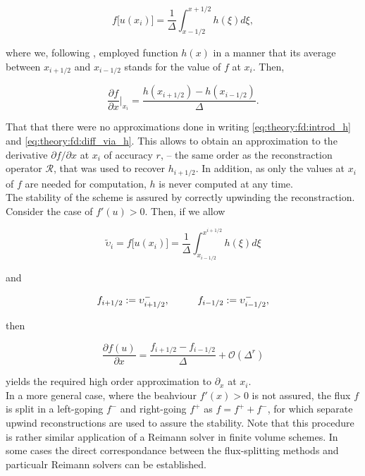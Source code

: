 \documentclass[11pt,a4paper,headinclude=true,DIV=14,BCOR=8mm,chapterprefix,listof=totoc,twoside,openright,abstracton]{scrbook}
\begin{document}
\begin{equation}
    f\big[u(x_i)\big] = \frac{1}{\Delta}\int_{x-1/2}^{x+1/2}h(\xi)d\xi,
    \label{eq:theory:fd:introd_h}
\end{equation}

where we, following \cite{Shu:1988}, employed function $h(x)$ in a manner that its average between $x_{i+1/2}$ and $x_{i-1/2}$ stands for the value of $f$ at $x_i$. Then, 

\begin{equation}
    \frac{\partial f}{\partial x}\Big|_{x_i} = \frac{h(x_{i+1/2}) - h(x_{i-1/2})}{\Delta}.
    \label{eq:theory:fd:diff_via_h}
\end{equation}

That that there were no approximations done in writing \ref{eq:theory:fd:introd_h} and \ref{eq:theory:fd:diff_via_h}. This allows to obtain an approximation to the derivative $\partial f/\partial x$ at $x_i$ of accuracy $r$, -- the same order as the reconstraction operator $\mathcal{R}$, that was used to recover $h_{i+1/2}$. In addition, as only the values at $x_i$ of $f$ are needed for computation, $h$ is never computed at any time. \\

The stability of the scheme is assured by correctly upwinding the reconstraction. Consider the case of $f'(u)>0$. Then, if we allow

\begin{equation}
    \widetilde{\upsilon}_i = f\big[u(x_i)\big] = \frac{1}{\Delta}\int_{x_{i-1/2}}^{x^{i+1/2}}h(\xi)d \xi
\end{equation}

and 

\begin{equation}
    f_{i+1/2} := \upsilon_{i+1/2} ^{-}, \hspace{10mm} f_{i-1/2} := \upsilon_{i-1/2} ^{-},
\end{equation}

then

\begin{equation}
    \frac{\partial f(u)}{\partial x} = \frac{f_{i+1/2} - f_{i-1/2}}{\Delta} + \mathcal{O}(\Delta^r)
\end{equation}

yields the required high order approximation to $\partial_x$ at $x_i$. \\

In a more general case, where the beahviour $f'(x)>0$ is not assured, the flux $f$ is split in a left-goping $f^{-}$ and right-going $f^{+}$ as $f = f^{+} + f^{-}$, for which separate upwind reconstructions are used to assure the stability. Note that this procedure is rather similar application of a Reimann solver in finite volume schemes. In some cases the direct correspondance between the flux-splitting methods and particualr Reimann solvers can be established. \\
\end{document}
